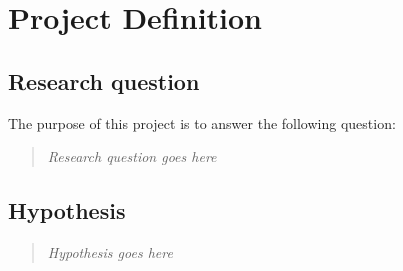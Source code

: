 \documentclass[pdftex,12pt,a4paper]{article}
\begin{document}
\vspace{10mm}

\renewcommand*{\arraystretch}{1.0}	%
\printnoidxglossary[sort={word}, title={\centering Abbreviations}, toctitle={Abbreviations}]	%

\afterpage{\rfoot{\thepage}}	%

\newpage


\newpage

\setcounter{page}{1}	%

\section{\textbf{Project Definition}} \label{sec:project definition}

\subsection{Research question} \label{sec:research question}
The purpose of this project is to answer the following question:

\vspace{3mm}
\begin{quote} 
	\centering
	\textit{Research question goes here}
\end{quote}

\subsection{Hypothesis} \label{sec:hypothesis}
\blindtext		%

\vspace{0.3cm}
\begin{quote} 
	\centering
	\textit{Hypothesis goes here}
\end{quote}
\end{document}
